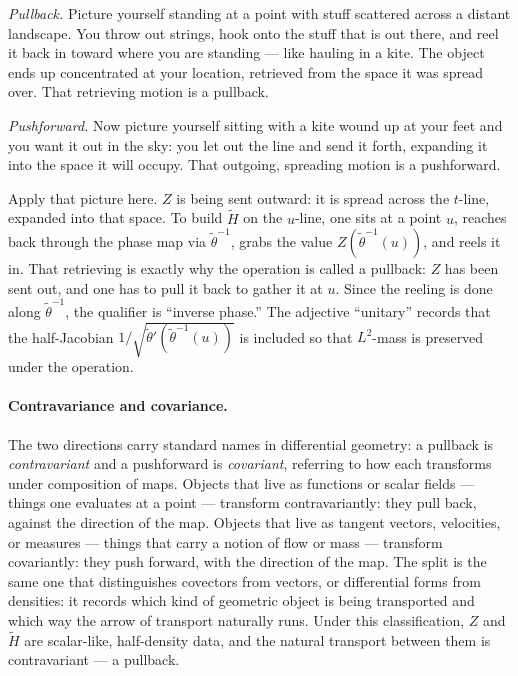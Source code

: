 \documentclass[11pt]{article}
\begin{document}
\emph{Pullback.} Picture yourself standing at a point with stuff scattered across a distant landscape. You throw out strings, hook onto the stuff that is out there, and reel it back in toward where you are standing --- like hauling in a kite. The object ends up concentrated at your location, retrieved from the space it was spread over. That retrieving motion is a pullback.

\emph{Pushforward.} Now picture yourself sitting with a kite wound up at your feet and you want it out in the sky: you let out the line and send it forth, expanding it into the space it will occupy. That outgoing, spreading motion is a pushforward.

Apply that picture here. $Z$ is being sent outward: it is spread across the $t$-line, expanded into that space. To build $\tilde H$ on the $u$-line, one sits at a point $u$, reaches back through the phase map via $\tilde\theta^{-1}$, grabs the value $Z(\tilde\theta^{-1}(u))$, and reels it in. That retrieving is exactly why the operation is called a pullback: $Z$ has been sent out, and one has to pull it back to gather it at $u$. Since the reeling is done along $\tilde\theta^{-1}$, the qualifier is ``inverse phase.'' The adjective ``unitary'' records that the half-Jacobian $1/\sqrt{\tilde\theta'(\tilde\theta^{-1}(u))}$ is included so that $L^2$-mass is preserved under the operation.

\paragraph{Contravariance and covariance.}
The two directions carry standard names in differential geometry: a pullback is \emph{contravariant} and a pushforward is \emph{covariant}, referring to how each transforms under composition of maps. Objects that live as functions or scalar fields --- things one evaluates at a point --- transform contravariantly: they pull back, against the direction of the map. Objects that live as tangent vectors, velocities, or measures --- things that carry a notion of flow or mass --- transform covariantly: they push forward, with the direction of the map. The split is the same one that distinguishes covectors from vectors, or differential forms from densities: it records which kind of geometric object is being transported and which way the arrow of transport naturally runs. Under this classification, $Z$ and $\tilde H$ are scalar-like, half-density data, and the natural transport between them is contravariant --- a pullback.
\end{document}
